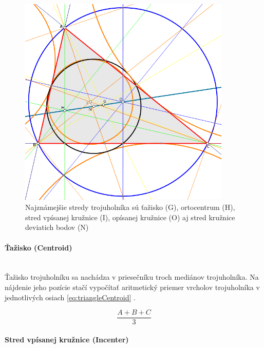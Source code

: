 \begin{figure}[H]
	\centering
	\includegraphics[width=0.9\textwidth]{obrazky-figures/Trigonometric_centres.png}
	\caption{Najznámejšie stredy trojuholníka sú ťažisko (G), ortocentrum (H), stred vpísanej kružnice (I), opísanej kružnice (O) aj stred kružnice deviatich bodov (N)}
	\label{fig:TriangleCenters}
\end{figure}


\paragraph{Ťažisko (Centroid)}\mbox{} \\

Ťažisko trojuholníku sa nachádza v priesečníku troch mediánov trojuholníka. Na nájdenie jeho pozície stačí vypočítať aritmetický priemer vrcholov trojuholníka v jednotlivých osiach \ref{eq:triangleCentroid} \cite{https://brilliant.org/wiki/triangles-centroid/}.



\begin{equation}
    \frac{A+B+C}{3}
    \label{eq:triangleCentroid}
\end{equation}

\paragraph{Stred vpísanej kružnice (Incenter)}\mbox{} \\

